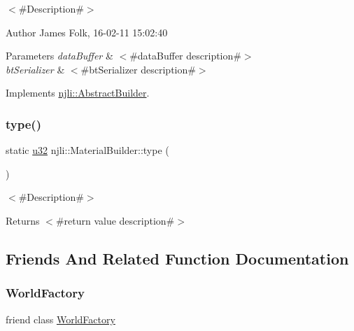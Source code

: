 $<$\#\+Description\#$>$ 

\begin{DoxyAuthor}{Author}
James Folk, 16-\/02-\/11 15\+:02\+:40
\end{DoxyAuthor}

\begin{DoxyParams}{Parameters}
{\em data\+Buffer} & $<$\#data\+Buffer description\#$>$ \\
\hline
{\em bt\+Serializer} & $<$\#bt\+Serializer description\#$>$ \\
\hline
\end{DoxyParams}


Implements \mbox{\hyperlink{classnjli_1_1_abstract_builder_ab66b774e02ccb9da554c9aab7fa6d981}{njli\+::\+Abstract\+Builder}}.

\mbox{\label{classnjli_1_1_material_builder_a9b4a5cabb705cd50ac7ec14844818edf}} 
\subsubsection{\texorpdfstring{type()}{type()}}
{\footnotesize\ttfamily static \mbox{\hyperlink{_util_8h_a10e94b422ef0c20dcdec20d31a1f5049}{u32}} njli\+::\+Material\+Builder\+::type (\begin{DoxyParamCaption}{ }\end{DoxyParamCaption})\hspace{0.3cm}{\ttfamily [static]}}

$<$\#\+Description\#$>$

\begin{DoxyReturn}{Returns}
$<$\#return value description\#$>$ 
\end{DoxyReturn}


\subsection{Friends And Related Function Documentation}
\mbox{\label{classnjli_1_1_material_builder_acb96ebb09abe8f2a37a915a842babfac}} 
\subsubsection{\texorpdfstring{World\+Factory}{WorldFactory}}
{\footnotesize\ttfamily friend class \mbox{\hyperlink{classnjli_1_1_world_factory}{World\+Factory}}\hspace{0.3cm}{\ttfamily [friend]}}



